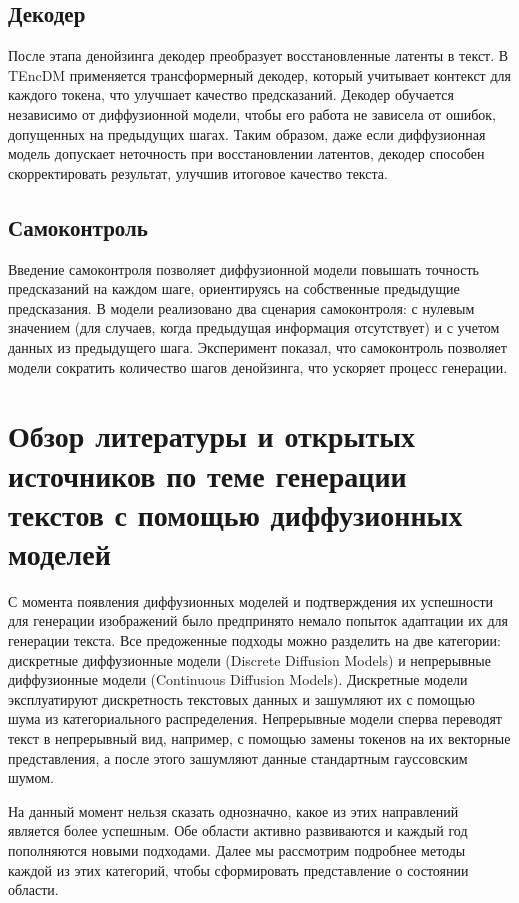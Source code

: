 \documentclass[a4paper, 12pt]{article}
\begin{document}
\subsection{Декодер}
После этапа денойзинга декодер преобразует восстановленные латенты в текст. В TEncDM применяется трансформерный декодер, который учитывает контекст для каждого токена, что улучшает качество предсказаний. Декодер обучается независимо от диффузионной модели, чтобы его работа не зависела от ошибок, допущенных на предыдущих шагах. Таким образом, даже если диффузионная модель допускает неточность при восстановлении латентов, декодер способен скорректировать результат, улучшив итоговое качество текста.

\subsection{Самоконтроль}
Введение самоконтроля позволяет диффузионной модели повышать точность предсказаний на каждом шаге, ориентируясь на собственные предыдущие предсказания. В модели реализовано два сценария самоконтроля: с нулевым значением (для случаев, когда предыдущая информация отсутствует) и с учетом данных из предыдущего шага. Эксперимент показал, что самоконтроль позволяет модели сократить количество шагов денойзинга, что ускоряет процесс генерации.


\section{Обзор литературы и открытых источников по теме генерации текстов с помощью диффузионных моделей}

С момента появления диффузионных моделей и подтверждения их успешности для генерации изображений было предпринято немало попыток адаптации их для генерации текста. Все предоженные подходы можно разделить на две категории: дискретные диффузионные модели (Discrete Diffusion Models) и непрерывные диффузионные модели (Continuous Diffusion Models). Дискретные модели эксплуатируют дискретность текстовых данных и зашумляют их с помощью шума из категориального распределения. Непрерывные модели сперва переводят текст в непрерывный вид, например, с помощью замены токенов на их векторные представления, а после этого зашумляют данные стандартным гауссовским шумом. 

На данный момент нельзя сказать однозначно, какое из этих направлений является более успешным. Обе области активно развиваются и каждый год пополняются новыми подходами. Далее мы рассмотрим подробнее методы каждой из этих категорий, чтобы сформировать представление о состоянии области.
\end{document}
